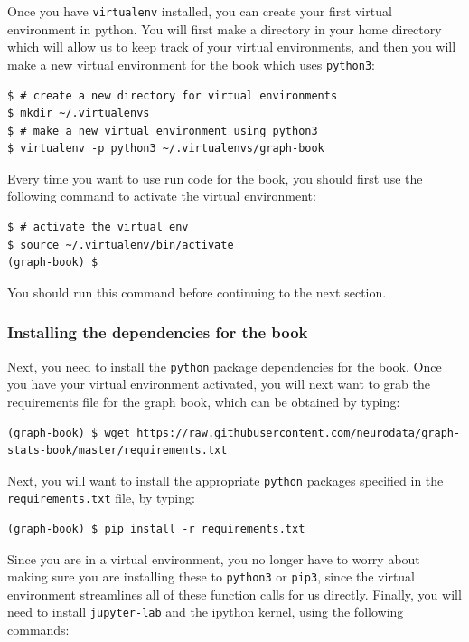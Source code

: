Once you have \texttt{virtualenv} installed, you can create your first virtual environment in python. You will first make a directory in your home directory which will allow us to keep track of your virtual environments, and then you will make a new virtual environment for the book which uses \texttt{python3}:

\begin{lstlisting}[style=bash]
$ # create a new directory for virtual environments
$ mkdir ~/.virtualenvs
$ # make a new virtual environment using python3
$ virtualenv -p python3 ~/.virtualenvs/graph-book
\end{lstlisting}

Every time you want to use run code for the book, you should first use the following command to activate the virtual environment:

\begin{lstlisting}[style=bash]
$ # activate the virtual env
$ source ~/.virtualenv/bin/activate
(graph-book) $ 
\end{lstlisting}

You should run this command before continuing to the next section.

\subsubsection{Installing the dependencies for the book}

Next, you need to install the \texttt{python} package dependencies for the book. Once you have your virtual environment activated, you will next want to grab the requirements file for the graph book, which can be obtained by typing:


\begin{lstlisting}[style=bash]
(graph-book) $ wget https://raw.githubusercontent.com/neurodata/graph-stats-book/master/requirements.txt
\end{lstlisting}

Next, you will want to install the appropriate \texttt{python} packages specified in the \texttt{requirements.txt} file, by typing:

\begin{lstlisting}[style=bash]
(graph-book) $ pip install -r requirements.txt
\end{lstlisting}

Since you are in a virtual environment, you no longer have to worry about making sure you are installing these to \texttt{python3} or \texttt{pip3}, since the virtual environment streamlines all of these function calls for us directly. Finally, you will need to install \texttt{jupyter-lab} and the ipython kernel, using the following commands:


